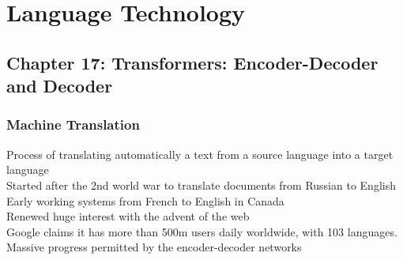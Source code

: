 


\subtitle{Chapter 17: Transformers: Encoder-Decoder and Decoder\\
\footnotesize{
\url{https://link.springer.com/chapter/10.1007/978-3-031-57549-5_17}
}}
\date{October 9, 2025}




\frame{\titlepage
}

%
%

\section{Language Technology}
\subsection{Chapter 17: Transformers: Encoder-Decoder and Decoder}

\begin{frame}[fragile]
\frametitle{Machine Translation}\color{structure}
Process of translating automatically a text from a source language into a target language\\
Started after the 2nd world war to translate documents from Russian to English\\
Early working systems from French to English in Canada\\
Renewed huge interest with the advent of the web\\
Google claims it has more than 500m users daily worldwide, with 103 languages.\\
Massive progress permitted by the encoder-decoder networks
\end{frame}

